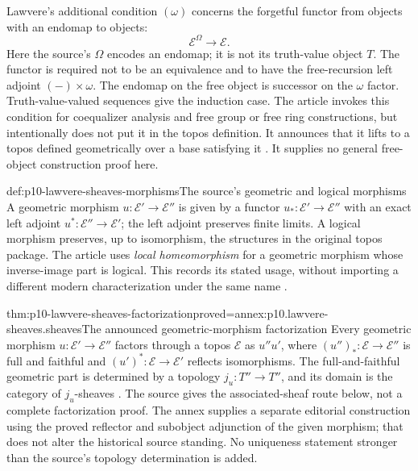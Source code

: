 Lawvere's additional condition \((\omega)\) concerns the forgetful
functor from objects with an endomap to objects:
\[
 \mathcal E^{\Omega}\longrightarrow\mathcal E.
\]
Here the source's \(\Omega\) encodes an endomap; it is not its
truth-value object \(T\).  The functor is required not to be an
equivalence and to have the free-recursion left adjoint
\((-)\times\omega\).  The endomap on the free object is successor
on the \(\omega\) factor.  Truth-value-valued sequences give the
induction case.  The article invokes this condition for coequalizer
analysis and free group or free ring constructions, but intentionally
does not put it in the topos definition.  It announces that it lifts
to a topos defined geometrically over a base satisfying it
\cite[p.~331]{Lawvere1970}.  It supplies no general free-object
construction proof here.



\begin{hbdefinition}{def:p10-lawvere-sheaves-morphisms}{The source's geometric and logical morphisms}
A geometric morphism \(u:\mathcal E'\to\mathcal E''\) is given
by a functor \(u_*:\mathcal E'\to\mathcal E''\) with an exact
left adjoint \(u^*:\mathcal E''\to\mathcal E'\); the left
adjoint preserves finite limits.  A logical morphism preserves, up
to isomorphism, the structures in the original topos package.  The
article uses \emph{local homeomorphism} for a geometric morphism
whose inverse-image part is logical.  This records its stated
usage, without importing a different modern characterization under
the same name \cite[p.~331]{Lawvere1970}.
\end{hbdefinition}

\begin{hbtheorem}{thm:p10-lawvere-sheaves-factorization}{proved=annex:p10.lawvere-sheaves.sheaves}{The announced geometric-morphism factorization}
Every geometric morphism
\(u:\mathcal E'\to\mathcal E''\) factors through a topos
\(\mathcal E\) as \(u''u'\), where
\((u'')_*:\mathcal E\to\mathcal E''\) is full and faithful
and \((u')^*:\mathcal E\to\mathcal E'\) reflects
isomorphisms.  The full-and-faithful geometric part is determined
by a topology \(j_u:T''\to T''\), and its domain is the
category of \(j_u\)-sheaves \cite[p.~331]{Lawvere1970}.
The source gives the associated-sheaf route below, not a complete
factorization proof.  The annex supplies a separate editorial
construction using the proved reflector and subobject adjunction
of the given morphism; that does not alter the historical source
standing.  No uniqueness statement stronger than the source's
topology determination is added.
\end{hbtheorem}


